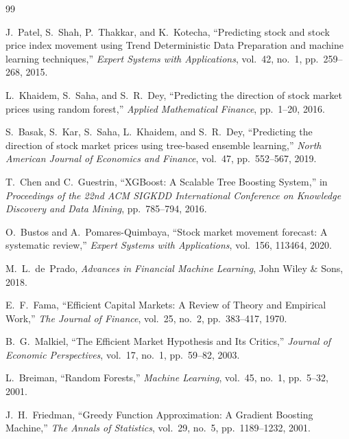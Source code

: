 \documentclass[12pt, a4paper]{report}
\begin{document}
	
	\renewcommand{\bibname}{References}
	\begin{thebibliography}{99}
		
		J.~Patel, S.~Shah, P.~Thakkar, and K.~Kotecha,
		``Predicting stock and stock price index movement using Trend Deterministic Data Preparation and machine learning techniques,''
		\textit{Expert Systems with Applications},
		vol.~42, no.~1, pp.~259--268, 2015.
		
		L.~Khaidem, S.~Saha, and S.~R.~Dey,
		``Predicting the direction of stock market prices using random forest,''
		\textit{Applied Mathematical Finance},
		pp.~1--20, 2016.
		
		S.~Basak, S.~Kar, S.~Saha, L.~Khaidem, and S.~R.~Dey,
		``Predicting the direction of stock market prices using tree-based ensemble learning,''
		\textit{North American Journal of Economics and Finance},
		vol.~47, pp.~552--567, 2019.
		
		T.~Chen and C.~Guestrin,
		``XGBoost: A Scalable Tree Boosting System,''
		in \textit{Proceedings of the 22nd ACM SIGKDD International Conference on Knowledge Discovery and Data Mining},
		pp.~785--794, 2016.
		
		O.~Bustos and A.~Pomares-Quimbaya,
		``Stock market movement forecast: A systematic review,''
		\textit{Expert Systems with Applications},
		vol.~156, 113464, 2020.
		
		M.~L.~de~Prado,
		\textit{Advances in Financial Machine Learning},
		John Wiley \& Sons, 2018.
		
		E.~F.~Fama,
		``Efficient Capital Markets: A Review of Theory and Empirical Work,''
		\textit{The Journal of Finance},
		vol.~25, no.~2, pp.~383--417, 1970.
		
		B.~G.~Malkiel,
		``The Efficient Market Hypothesis and Its Critics,''
		\textit{Journal of Economic Perspectives},
		vol.~17, no.~1, pp.~59--82, 2003.
		
		L.~Breiman,
		``Random Forests,''
		\textit{Machine Learning},
		vol.~45, no.~1, pp.~5--32, 2001.
		
		J.~H.~Friedman,
		``Greedy Function Approximation: A Gradient Boosting Machine,''
		\textit{The Annals of Statistics},
		vol.~29, no.~5, pp.~1189--1232, 2001.
		

\end{thebibliography}
\end{document}
